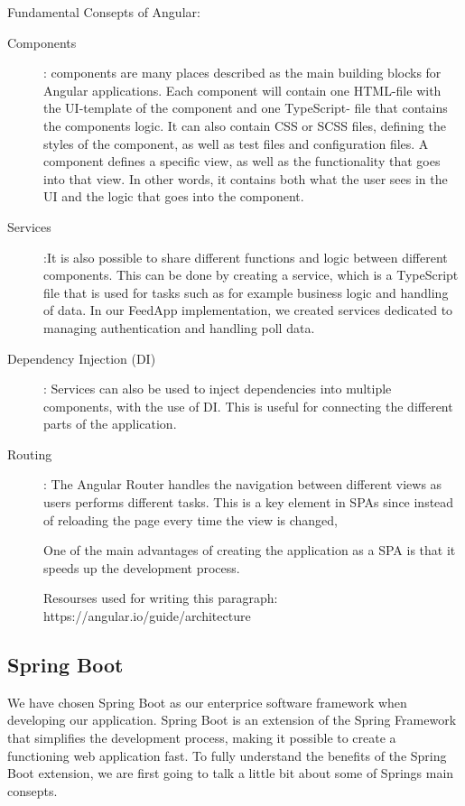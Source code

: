 Fundamental Consepts of Angular: 
\begin{description}
\item[Components]: components are many places described as the main building blocks for Angular applications. Each
component will contain one HTML-file with the UI-template of the component and one TypeScript-
file that contains the components logic. It can also contain CSS or SCSS files, defining the styles of the
component, as well as test files and configuration files. A component defines a specific view, as well
as the functionality that goes into that view. In other words, it contains both what the user sees in
the UI and the logic that goes into the component.
\item[Services]:It is also possible to share different functions and logic between different components. This
can be done by creating a service, which is a TypeScript file that is used for tasks such as for example
business logic and handling of data. In our FeedApp implementation, we created services dedicated to managing authentication and handling poll data.
\item[Dependency Injection (DI)]: Services can also be used to inject dependencies into multiple
components, with the use of DI. This is useful for connecting the different parts of the application.
\item[Routing]: The Angular Router handles the navigation between different views as users performs different tasks. This is a key element in SPAs since instead of reloading the page every time the view is changed, 

One of the main advantages of creating the application as a SPA is that it speeds up the development
process.

Resourses used for writing this paragraph: https://angular.io/guide/architecture 
\end{description}

\subsection{Spring Boot}
\label{subsec:springboot}
We have chosen Spring Boot as our enterprice software framework when developing our application. Spring Boot is an extension of the Spring Framework that simplifies the development process, making it possible to create a functioning web application fast. To fully understand the benefits of the Spring Boot extension, we are first going to talk a little bit about some of Springs main consepts.  

